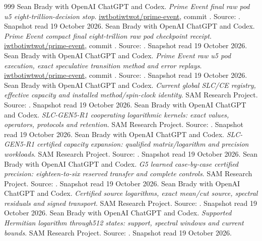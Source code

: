 \begin{thebibliography}{999}
 Sean Brady with OpenAI ChatGPT and Codex. \emph{Prime Event final raw pod u5 eight-trillion-decision stop}. \href{https://github.com/iwtbotiwtwot/prime-event/blob/eab9da08608489ef62dc418a4e7113e4e14fb6fe/docs/pod-eight-trillion.md}{iwtbotiwtwot/prime-event}, commit . Source: . Snapshot read 19 October 2026.
 Sean Brady with OpenAI ChatGPT and Codex. \emph{Prime Event compact final eight-trillion raw pod checkpoint receipt}. \href{https://github.com/iwtbotiwtwot/prime-event/blob/eab9da08608489ef62dc418a4e7113e4e14fb6fe/evidence/pod/eight-trillion-20261003/FINAL.json}{iwtbotiwtwot/prime-event}, commit . Source: . Snapshot read 19 October 2026.
 Sean Brady with OpenAI ChatGPT and Codex. \emph{Prime Event raw u5 pod execution, exact speculative transition method and error replays}. \href{https://github.com/iwtbotiwtwot/prime-event/blob/eab9da08608489ef62dc418a4e7113e4e14fb6fe/docs/pod-production.md}{iwtbotiwtwot/prime-event}, commit . Source: . Snapshot read 19 October 2026.
 Sean Brady with OpenAI ChatGPT and Codex. \emph{Current global SLC/CE registry, effective capacity and installed method/spin-clock identity}. SAM Research Project. Source: . Snapshot read 19 October 2026.
 Sean Brady with OpenAI ChatGPT and Codex. \emph{SLC-GEN5-R1 cooperating logarithmic kernels: exact values, operators, protocols and retention}. SAM Research Project. Source: . Snapshot read 19 October 2026.
 Sean Brady with OpenAI ChatGPT and Codex. \emph{SLC-GEN5-R1 certified capacity expansion: qualified matrix/logarithm and precision workloads}. SAM Research Project. Source: . Snapshot read 19 October 2026.
 Sean Brady with OpenAI ChatGPT and Codex. \emph{G5 learned case-by-case certified precision: eighteen-to-six reserved transfer and complete controls}. SAM Research Project. Source: . Snapshot read 19 October 2026.
 Sean Brady with OpenAI ChatGPT and Codex. \emph{Certified source logarithms, exact mean/cut source, spectral residuals and signed transport}. SAM Research Project. Source: . Snapshot read 19 October 2026.
 Sean Brady with OpenAI ChatGPT and Codex. \emph{Supported Hermitian logarithm through512 states: support, spectral windows and current bounds}. SAM Research Project. Source: . Snapshot read 19 October 2026.

\end{thebibliography}
